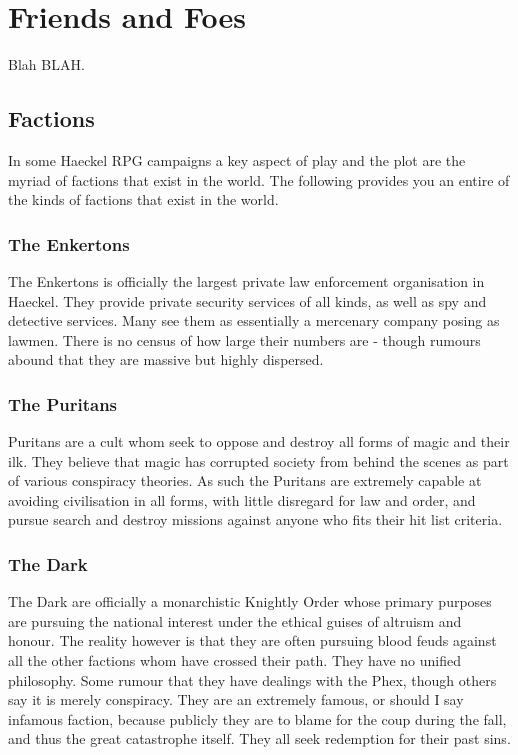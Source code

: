 \chapter{Friends and Foes}
\newpage
Blah BLAH.
\newpage
\begin{multicols}{2}
 

\section{Factions}\label{factions}

In some Haeckel RPG campaigns a key aspect of play and the plot are the myriad of factions that exist in the world. The following provides you an entire of the kinds of factions that exist in the world.

    \subsection{The Enkertons} The Enkertons is officially the largest private law enforcement organisation in Haeckel. They provide private security services of all kinds, as well as spy and detective services. Many see them as essentially a mercenary company posing as lawmen. There is no census of how large their numbers are - though rumours abound that they are massive but highly dispersed.
    \subsection{The Puritans} Puritans are a cult whom seek to oppose and destroy all forms of magic and their ilk. They believe that magic has corrupted society from behind the scenes as part of various conspiracy theories. As such the Puritans are extremely capable at avoiding civilisation in all forms, with little disregard for law and order, and pursue search and destroy missions against anyone who fits their hit list criteria.
    \subsection{The Dark} The Dark are officially a monarchistic Knightly Order whose primary purposes are pursuing the national interest under the ethical guises of altruism and honour. The reality however is that they are often pursuing blood feuds against all the other factions whom have crossed their path. They have no unified philosophy. Some rumour that they have dealings with the Phex, though others say it is merely conspiracy. They are an extremely famous, or should I say infamous faction, because publicly they are to blame for the coup during the fall, and thus the great catastrophe itself. They all seek redemption for their past sins.

\end{multicols}
